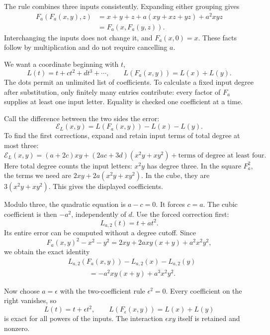 \documentclass[11pt,letterpaper]{article}
\numberwithin{equation}{section}
\theoremstyle{definition}\newtheorem{example}[theorem]{Example}
\newcommand{\defect}{\mathcal E}
\begin{document}
The rule combines three inputs consistently. Expanding either grouping gives
\begin{align*}
 F_a(F_a(x,y),z)
 &=x+y+z+a(xy+xz+yz)+a^2xyz\\
 &=F_a(x,F_a(y,z)).
\end{align*}
Interchanging the inputs does not change it, and \(F_a(x,0)=x\). These facts follow by multiplication and do not require cancelling \(a\).

We want a coordinate beginning with \(t\),
\begin{equation}\label{eq:log-identity}
 L(t)=t+c t^2+d t^3+\cdots,
 \qquad L(F_a(x,y))=L(x)+L(y).
\end{equation}
The dots permit an unlimited list of coefficients. To calculate a fixed input degree after substitution, only finitely many entries contribute: every factor of \(F_a\) supplies at least one input letter. Equality is checked one coefficient at a time.

Call the difference between the two sides the error:
\[
 \defect_L(x,y)=L(F_a(x,y))-L(x)-L(y).
\]
To find the first corrections, expand and retain input terms of total degree at most three:
\begin{equation}\label{eq:first-coefficients}
 \defect_L(x,y)
 =(a+2c)xy+(2ac+3d)(x^2y+xy^2)
 +\text{terms of degree at least four}.
\end{equation}
Here total degree counts the input letters: \(x^2y\) has degree three. In the square \(F_a^2\), the terms we need are \(2xy+2a(x^2y+xy^2)\). In the cube, they are \(3(x^2y+xy^2)\). This gives the displayed coefficients.

Modulo three, the quadratic equation is \(a-c=0\). It forces \(c=a\). The cubic coefficient is then \(-a^2\), independently of \(d\). Use the forced correction first:
\[
 L_{a,2}(t)=t+at^2.
\]
Its entire error can be computed without a degree cutoff. Since
\[
 F_a(x,y)^2-x^2-y^2
 =2xy+2a xy(x+y)+a^2x^2y^2,
\]
we obtain the exact identity
\begin{equation}\label{eq:exact-char3-defect}
 \begin{split}
 &L_{a,2}(F_a(x,y))-L_{a,2}(x)-L_{a,2}(y)\\
 &\hspace{3em}=-a^2xy(x+y)+a^3x^2y^2.
 \end{split}
\end{equation}

Now choose \(a=\epsilon\) with the two-coefficient rule \(\epsilon^2=0\). Every coefficient on the right vanishes, so
\begin{equation}\label{eq:dual-repair}
 L(t)=t+\epsilon t^2,
 \qquad L(F_\epsilon(x,y))=L(x)+L(y)
\end{equation}
is exact for all powers of the inputs. The interaction \(\epsilon xy\) itself is retained and nonzero.
\end{document}
